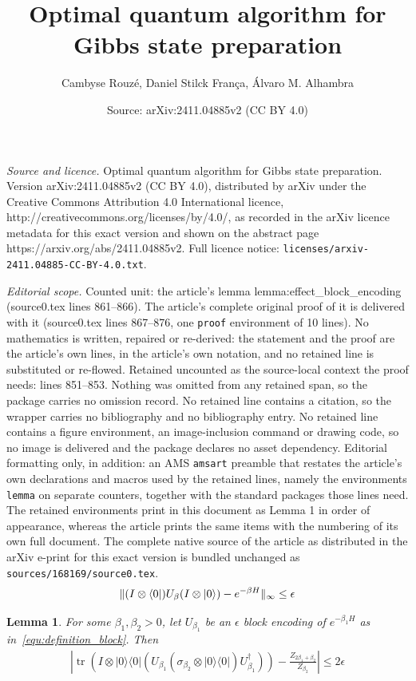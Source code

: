 \documentclass[10pt,a4paper]{amsart}
\title{Optimal quantum algorithm for Gibbs state preparation}
\author{Cambyse Rouz\'e, Daniel Stilck Fran\c{c}a, \'Alvaro M. Alhambra}
\date{Source: arXiv:2411.04885v2 (CC BY 4.0)}
\newtheorem{lemma}{Lemma}
\newcommand{\ketbra}[2]{|#1\rangle\langle #2|}
\def\lb{\left(}
\def\rb{\right)}
\newcommand{\tr}[1]{\operatorname{tr}\lb#1\rb}
\begin{document}
\maketitle

\noindent\emph{Source and licence.} Optimal quantum algorithm for Gibbs state preparation. Version arXiv:2411.04885v2 (CC BY 4.0), distributed by arXiv under the Creative Commons Attribution 4.0 International licence, http://creativecommons.org/licenses/by/4.0/, as recorded in the arXiv licence metadata for this exact version and shown on the abstract page https://arxiv.org/abs/2411.04885v2. Full licence notice: \texttt{licenses/arxiv-2411.04885-CC-BY-4.0.txt}.\par\smallskip

\noindent\textit{Editorial scope.} Counted unit: the article's lemma lemma:effect\_block\_encoding (source0.tex lines 861--866). The article's complete original proof of it is delivered with it (source0.tex lines 867--876, one \texttt{proof} environment of 10 lines). No mathematics is written, repaired or re-derived: the statement and the proof are the article's own lines, in the article's own notation, and no retained line is substituted or re-flowed.  Retained uncounted as the source-local context the proof needs: lines 851--853.  Nothing was omitted from any retained span, so the package carries no omission record.  No retained line contains a citation, so the wrapper carries no bibliography and no bibliography entry.  No retained line contains a figure environment, an image-inclusion command or drawing code, so no image is delivered and the package declares no asset dependency.  Editorial formatting only, in addition: an AMS \texttt{amsart} preamble that restates the article's own declarations and macros used by the retained lines, namely the environments \texttt{lemma} on separate counters, together with the standard packages those lines need.  The retained environments print in this document as Lemma 1 in order of appearance, whereas the article prints the same items with the numbering of its own full document.  The complete native source of the article as distributed in the arXiv e-print for this exact version is bundled unchanged as \texttt{sources/168169/source0.tex}.
	\begin{align}\label{equ:definition_block}
		\|(I\otimes \bra{0})U_\beta(I\otimes \ket{0})-e^{-\beta H}\|_\infty\leq \epsilon
	\end{align}  

\begin{lemma}\label{lemma:effect_block_encoding}
	For some $\beta_1,\beta_2>0$, let $U_{\beta_1}$ be an $\epsilon$ block encoding of $e^{-\beta_1 H}$ as in~\eqref{equ:definition_block}. Then
	\begin{align}
		\left|\tr{I \otimes \ketbra{0}{0}\left(U_{\beta_1}(\sigma_{\beta_2}\otimes\ketbra{0}{0})U_{\beta_1}^\dagger\right)} - \frac{Z_{2\beta_{1}+\beta_{2}}}{Z_{\beta_{2}}}\right| \leq 2\epsilon
	\end{align}
\end{lemma}
\end{document}
